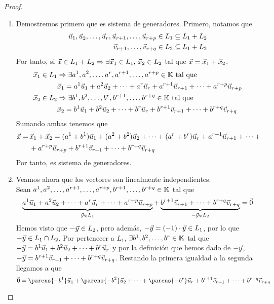 \documentclass[../algebra_lineal.tex]{subfiles}
\begin{document}
\begin{proof}
    \begin{enumerate}
        \item Demostremos primero que es sistema de generadores. Primero, notamos que 
        \begin{align*}
            {\vec{u}}_{1}, {\vec{u}}_{2}, \dots, {\vec{u}}_{r}, \vec{u}_{r+1}, \dots, \vec{u}_{r+p} &\in L_1 \subseteq L_1 + L_2 \\
            \vec{v}_{r+1}, \dots, \vec{v}_{r+q} &\in L_2 \subseteq L_1 + L_2
        \end{align*}
        Por tanto, si $\vec{x} \in L_1 + L_2 \Rightarrow \exists \vec{x}_1 \in L_1, \, \vec{x}_2 \in L_2$ tal que $\vec{x} = \vec{x}_1 + \vec{x}_2$.
        \begin{align*}
          \vec{x}_1 \in L_1 &\Rightarrow \exists {a}^{1}, {a}^{2}, \dots, {a}^{r}, a^{r+1}, \dots, a^{r+p} \in \mathbb{K} \mathrm{\,\, tal \,\, que \,\,} \\
                        &\vec{x}_1 = {a}^{1}\vec{u}_{1}+{a}^{2}\vec{u}_{2}+\dots+{a}^{r}\vec{u}_{r} + a^{r+1}\vec{u}_{r+1} + \dots + a^{r+p}\vec{u}_{r+p} \\
            \vec{x}_2 \in L_2 &\Rightarrow \exists {b}^{1}, {b}^{2}, \dots, {b}^{r}, b^{r+1}, \dots, b^{r+q} \in \mathbb{K} \mathrm{\,\, tal \,\, que \,\,} \\
                &\vec{x}_2 = {b}^{1}\vec{u}_{1}+{b}^{2}\vec{u}_{2}+\dots+{b}^{r}\vec{u}_{r} + b^{r+1}\vec{v}_{r+1} + \dots + b^{r+q}\vec{v}_{r+q}
        \end{align*}
        Sumando ambas tenemos que 
        \begin{align*}
            \vec{x} = \, &\vec{x}_1 + \vec{x}_2 = (a^1 + b^1)\vec{u}_1 + (a^2 + b^2)\vec{u}_2 + \dots + (a^r + b^r)\vec{u}_r + a^{r+1}\vec{u}_{r+1} + \dots + \\
                  &+ a^{r+p} \vec{u}_{r+p} + b^{r+1}\vec{v}_{r+1} + \dots + b^{r+q}\vec{v}_{r+q}
        \end{align*}
        Por tanto, es sistema de generadores.
        \item Veamos ahora que los vectores son linealmente independientes. \\
        Sean ${a}^{1}, {a}^{2}, \dots, {a}^{r+1}, \dots, a^{r+p}, b^{r+1}, \dots, b^{r+q} \in \mathbb{K}$ tal que 
        \[
            \underbrace{a^1\vec{u}_{1} + a^2\vec{u}_{2} + \dots + a^r\vec{u}_{r} + \dots + a^{r+p}\vec{u}_{r+p}}_{\vec{y} \in L_1} + \underbrace{b^{r+1}\vec{v}_{r+1} +\dots + b^{r+q}\vec{v}_{r+q}}_{-\vec{y} \in L_2} = \vec{0}
        \]
        Hemos visto que $-\vec{y} \in L_2$, pero además, $-\vec{y} = (-1) \cdot \vec{y} \in L_1$, por lo que $-\vec{y} \in L_1 \cap L_2$. Por pertenecer a $L_1$, $\exists {b}^{1}, {b}^{2}, \dots, {b}^{r} \in \mathbb{K}$ tal que $-\vec{y} = {b}^{1}\vec{u}_{1}+{b}^{2}\vec{u}_{2}+\dots+{b}^{r}\vec{u}_{r}$ y por la definición que hemos dado de $-\vec{y}$, $-\vec{y} = b^{r+1} \vec{v}_{r+1} + \dots + b^{r+q}\vec{v}_{r+q}$. Restando la primera igualdad a la segunda llegamos a que   
        \[
            \zv = \parens{-b^1} \vu_1 + \parens{-b^2} \vu_2 + \dots + \parens{-b^r}\vu_{r} + b^{r+1}\vv_{r+1} + \dots + b^{r+q} \vv_{r+q}
\]
\end{enumerate}
\end{proof}
\end{document}
